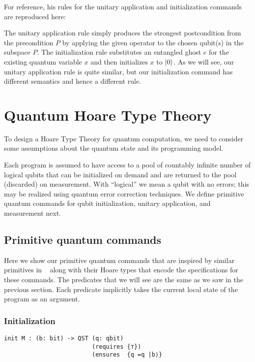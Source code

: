 \documentclass[adraft,creativecommons]{eptcs}
\newcommand{\HoareT}[3]{
    \{#1\} ~#2~ \{#3\}
}
\theoremstyle{definition}
\theoremstyle{remark}
\begin{document}
For reference, his rules for the unitary application and initialization commands are reproduced here:

The unitary application rule simply produces the strongest postcondition from the precondition $P$ by applying the given operator to the chosen qubit(s) in the subspace $P$. The initialization rule substitutes an entangled ghost $e$ for the existing quantum variable $x$ and then initializes $x$ to $\ket{0}$. As we will see, our unitary application rule is quite similar, but our initialization command has different semantics and hence a different rule.

\section{Quantum Hoare Type Theory}
To design a Hoare Type Theory for quantum computation, we need to consider some assumptions about the quantum state and its programming model.

Each program is assumed to have access to a pool of countably infinite number of logical qubits that can be initialized on demand and are returned to the pool (discarded) on measurement. With ``logical'' we mean a qubit with no errors; this may be realized using quantum error correction techniques. We define primitive quantum commands for qubit initialization, unitary application, and measurement next.

\subsection{Primitive quantum commands}

Here we show our primitive quantum commands that are inspired by similar primitives in ~\parencite{qio} along with their Hoare types that encode the specifications for these commands. The predicates that we will see are the same as we saw in the previous section. Each predicate implicitly takes the current local state of the program as an argument.

\subsubsection{Initialization}
\begin{lstlisting}[language=QHaskell]
init M : (b: bit) -> QST (q: qbit)
                         (requires {⊤})
                         (ensures  {q =q |b⟩}
\end{lstlisting}
\end{document}
